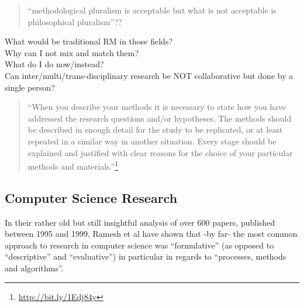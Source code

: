\begin{quote}
  ``methodological pluralism is acceptable but what is not acceptable is philosophical pluralism''??
\end{quote}

\begin{fcom}
  What would be traditional RM in those fields?\\
  Why can I not mix and match them?\\
  What do I do now/instead?\\
  Can inter/multi/trans-disciplinary research be NOT collaborative but done by a single person?
\end{fcom}

\begin{quote}
  ``When you describe your methods it is necessary to state how you have addressed the research questions and/or hypotheses. The methods should be described in enough detail for the study to be replicated, or at least repeated in a similar way in another situation. Every stage should be explained and justified with clear reasons for the choice of your particular methods and materials.''\footnote{\url{http://bit.ly/1Edj84y}} %
\end{quote}

\subsection{Computer Science Research}

In their rather old but still insightful analysis of over 600 papers, published between 1995 and 1999, Ramesh et al \autocite{Ramesh2004} have shown that -by far- the most common approach to research in computer science was ``formulative'' (as opposed to ``descriptive'' and ``evaluative'') in particular in regards to ``processes, methods and algorithms''.

